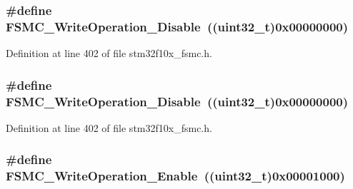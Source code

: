 \subsubsection[{\texorpdfstring{F\+S\+M\+C\+\_\+\+Write\+Operation\+\_\+\+Disable}{FSMC_WriteOperation_Disable}}]{\setlength{\rightskip}{0pt plus 5cm}\#define F\+S\+M\+C\+\_\+\+Write\+Operation\+\_\+\+Disable~(({\bf uint32\+\_\+t})0x00000000)}\hypertarget{group___f_s_m_c___write___operation_ga74176320484248f06abae854170f9d9f}{}\label{group___f_s_m_c___write___operation_ga74176320484248f06abae854170f9d9f}


Definition at line 402 of file stm32f10x\+\_\+fsmc.\+h.

\subsubsection[{\texorpdfstring{F\+S\+M\+C\+\_\+\+Write\+Operation\+\_\+\+Disable}{FSMC_WriteOperation_Disable}}]{\setlength{\rightskip}{0pt plus 5cm}\#define F\+S\+M\+C\+\_\+\+Write\+Operation\+\_\+\+Disable~(({\bf uint32\+\_\+t})0x00000000)}\hypertarget{group___f_s_m_c___write___operation_ga74176320484248f06abae854170f9d9f}{}\label{group___f_s_m_c___write___operation_ga74176320484248f06abae854170f9d9f}


Definition at line 402 of file stm32f10x\+\_\+fsmc.\+h.

\subsubsection[{\texorpdfstring{F\+S\+M\+C\+\_\+\+Write\+Operation\+\_\+\+Enable}{FSMC_WriteOperation_Enable}}]{\setlength{\rightskip}{0pt plus 5cm}\#define F\+S\+M\+C\+\_\+\+Write\+Operation\+\_\+\+Enable~(({\bf uint32\+\_\+t})0x00001000)}\hypertarget{group___f_s_m_c___write___operation_ga2478beb6dd8861b34a16b8a57a795e56}{}\label{group___f_s_m_c___write___operation_ga2478beb6dd8861b34a16b8a57a795e56}


